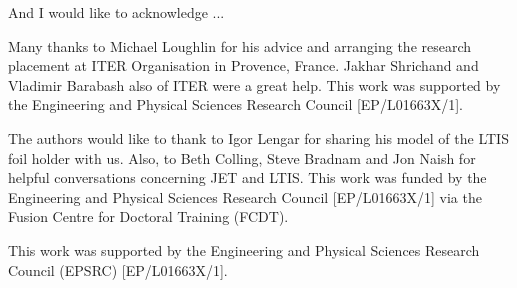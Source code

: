 
\begin{acknowledgements}      


And I would like to acknowledge ...

Many thanks to Michael Loughlin for his advice and arranging the research placement at ITER Organisation in Provence, France. Jakhar Shrichand and Vladimir Barabash also of ITER were a great help. This work was supported by the Engineering and Physical Sciences Research Council [EP/L01663X/1].

The authors would like to thank to Igor Lengar for sharing his model of the LTIS foil holder with us. Also, to Beth Colling, Steve Bradnam and Jon Naish for helpful conversations concerning JET and LTIS. This work was funded by the Engineering and Physical Sciences Research Council [EP/L01663X/1] via the Fusion Centre for Doctoral Training (FCDT).

This work was supported by the Engineering and Physical Sciences Research Council (EPSRC) [EP/L01663X/1].

\end{acknowledgements}
